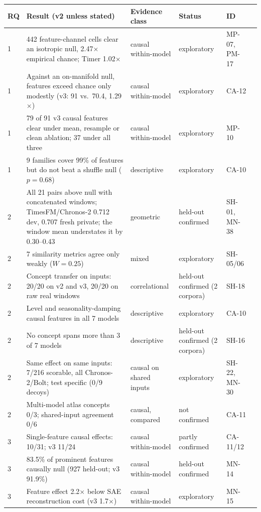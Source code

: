 \begin{table}[!tb]
\centering
\footnotesize
\setlength{\tabcolsep}{3pt}
\scriptsize
\begin{tabularx}{\textwidth}{@{}l>{\raggedright}Xllll@{}}
\toprule
RQ & Result (v2 unless stated) & Evidence class & Status & ID \\
\midrule
1 & 442 feature-channel cells clear an isotropic null, 2.47$\times$ empirical chance; Timer 1.02$\times$ & causal within-model & exploratory & MP-07, PM-17 \\
1 & Against an on-manifold null, features exceed chance only modestly (v3: 91 vs.\ 70.4, 1.29$\times$) & causal within-model & exploratory & CA-12 \\
1 & 79 of 91 v3 causal features clear under mean, resample or clean ablation; 37 under all three & causal within-model & exploratory & MP-10 \\
1 & 9 families cover 99\% of features but do not beat a shuffle null ($p=0.68$) & descriptive & exploratory & CA-10 \\
2 & All 21 pairs above null with concatenated windows; TimesFM/Chronos-2 0.712 dev, 0.707 fresh private; the window mean understates it by 0.30--0.43 & geometric & held-out confirmed & SH-01, MN-38 \\
2 & 7 similarity metrics agree only weakly ($W=0.25$) & mixed & exploratory & SH-05/06 \\
2 & Concept transfer on inputs: 20/20 on v2 and v3, 20/20 on raw real windows & correlational & held-out confirmed (2 corpora) & SH-18 \\
2 & Level and seasonality-damping causal features in all 7 models & descriptive & exploratory & CA-10 \\
2 & No concept spans more than 3 of 7 models & descriptive & held-out confirmed (2 corpora) & SH-16 \\
2 & Same effect on same inputs: 7/216 scorable, all Chronos-2/Bolt; test specific (0/9 decoys) & causal on shared inputs & exploratory & SH-22, MN-30 \\
2 & Multi-model atlas concepts 0/3; shared-input agreement 0/6 & causal, compared & not confirmed & CA-11 \\
3 & Single-feature causal effects: 10/31; v3 11/24 & causal within-model & partly confirmed & CA-11/12 \\
3 & 83.5\% of prominent features causally null (927 held-out; v3 91.9\%) & causal within-model & held-out confirmed & MN-14 \\
3 & Feature effect 2.2$\times$ below SAE reconstruction cost (v3 1.7$\times$) & causal within-model & exploratory & MN-15 \\

\end{tabularx}
\end{table}
